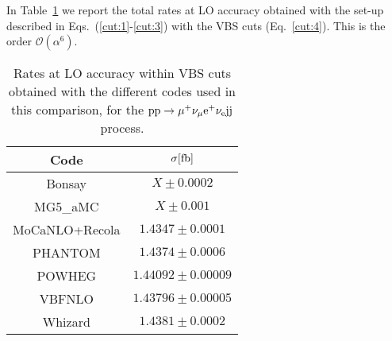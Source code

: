 In Table~\ref{tab:wg1_LOrates} we report the total rates at LO accuracy obtained with the set-up described in Eqs.~(\ref{cut:1}-\ref{cut:3}) with the VBS cuts (Eq.~\ref{cut:4}).
This is the order $\mathcal{O}(\alpha^6)$.

\begin{table}[h!]
    \centering
    \begin{tabular}{c|c}
        Code  &  $\sigma[\rm{fb}]$  \\
        \hline
        \hline
        {\sc Bonsay}  &  $X \pm 0.0002$ \\
        {\sc MG5\_aMC}&  $X \pm 0.001$  \\
        {\sc MoCaNLO+Recola}  &  $1.4347 \pm 0.0001$ \\
        {\sc PHANTOM} &  $1.4374 \pm 0.0006 $  \\
        {\sc POWHEG}  &  $1.44092 \pm 0.00009$ \\
        {\sc VBFNLO}  &  $1.43796 \pm 0.00005$ \\
        {\sc Whizard} &  $1.4381 \pm 0.0002 $
    \end{tabular}
    \caption{\label{tab:wg1_LOrates} Rates at LO accuracy within VBS cuts obtained with the different codes used in this comparison,
    for the ${\rm p}{\rm p}\to\mu^+\nu_\mu{\rm e}^+\nu_{\rm e}{\rm j}{\rm j}$ process.}
\end{table}
